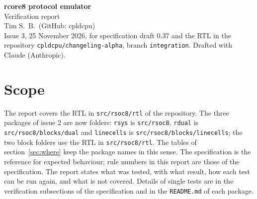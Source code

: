 \documentclass[10pt,a4paper]{article}
\begin{document}
\begin{center}
{\LARGE\bfseries\color{accent} rcore8 protocol emulator}\\[4pt]
{\large Verification report}\\[8pt]
Tim S.\ B.\ (GitHub: cpldcpu)\\[2pt]
{\small Issue 3, 25 November 2026, for specification draft 0.37 and the RTL in the repository \texttt{cpldcpu/changeling-alpha}, branch \texttt{integration}. Drafted with Claude (Anthropic).}
\end{center}

\vspace{2pt}
\noindent{}

\section{Scope}

The report covers the RTL in \texttt{src/rsoc8/rtl} of the repository. The three packages of issue 2 are now
folders: \texttt{rsys} is \texttt{src/rsoc8}, \texttt{rdual} is \texttt{src/rsoc8/blocks/dual} and \texttt{linecells}
is \texttt{src/rsoc8/blocks/linecells}; the two block folders use the RTL in \texttt{src/rsoc8/rtl}. The tables of
section~\ref{sec:where} keep the package names in this sense. The specification is the
reference for expected behaviour; rule numbers in this report are those of the specification. The report states
what was tested, with what result, how each test can be run again, and what is not covered. Details of single
tests are in the verification subsections of the specification and in the \texttt{README.md} of each package.
\end{document}
